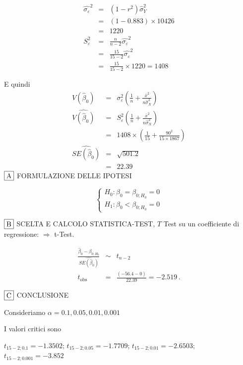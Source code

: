 \documentclass[
  11pt,
]{book}
\theoremstyle{mytheoremstyle}
\theoremstyle{mydefstyle}
\newenvironment{sol}
  {
  \begin{tcolorbox}[enhanced,breakable,arc=0.1mm,boxrule=1pt,colback=white,colframe=iblue,
  title=\bf \fontfamily{lmss}\selectfont \hspace{.5 cm} Soluzione,drop fuzzy shadow]

}{
\end{tcolorbox}
  }
\begin{document}
\begin{sol}
\begin{eqnarray*}
\hat{\sigma_\varepsilon}^2&=&(1-r^2)\hat\sigma_Y^2\\
&=& (1- 0.883 )\times 10426 \\
   &=&  1220 \\
   S_\varepsilon^2 &=& \frac{n} {n-2} \hat{\sigma_\varepsilon}^2\\
   &=&  \frac{ 15 } { 15 -2} \hat{\sigma_\varepsilon}^2 \\
 &=&  \frac{ 15 } { 15 -2} \times  1220  =  1408  
\end{eqnarray*}

E quindi\begin{eqnarray*}
V(\hat\beta_{0}) &=& \sigma_{\varepsilon}^{2} \left( \frac{1} {n}  +  \frac{\bar{x}^{2}} {n \hat{\sigma}^{2}_{X}} \right)\\
\widehat{V(\hat\beta_{0})} &=& S_{\varepsilon}^{2}\left( \frac{1} {n}  +  \frac{\bar{x}^{2}} {n \hat{\sigma}^{2}_{X}} \right)\ \\
 &=&  1408 \times\left( \frac{1} { 15 }  +  \frac{ 90 ^{2}} { 15 \times  1867 } \right)\\
 \widehat{SE(\hat\beta_{0})}        &=&  \sqrt{ 501.2 }\\
 &=&  22.39 
\end{eqnarray*}
\(\fbox{A}\) FORMULAZIONE DELLE IPOTESI

\[\begin{cases}
   H_0: \beta_0 = \beta_{0;H_0}=0 \\
   H_1: \beta_0 < \beta_{0;H_0}=0 
   \end{cases}\]

\(\fbox{B}\) SCELTA E CALCOLO STATISTICA-TEST, \(T\)
Test su un coefficiente di regressione: \(\Rightarrow\) t-Test.

\begin{eqnarray*}
 \frac{\hat\beta_{ 0 } - \beta_{ 0 ;H_0}} {\widehat{SE(\hat\beta_{ 0 })}}&\sim&t_{n-2}\\
   t_{\text{obs}}
&=& \frac{ ( -56.4 -  0 )} { 22.39 }
 =   -2.519 \, .
\end{eqnarray*}

\(\fbox{C}\) CONCLUSIONE

Consideriamo \(\alpha=0.1, 0.05, 0.01, 0.001\)

I valori critici sono

\(t_{15-2;0.1}=-1.3502\); \(t_{15-2;0.05}=-1.7709\); \(t_{15-2;0.01}=-2.6503\); \(t_{15-2;0.001}=-3.852\)


\end{sol}
\end{document}
